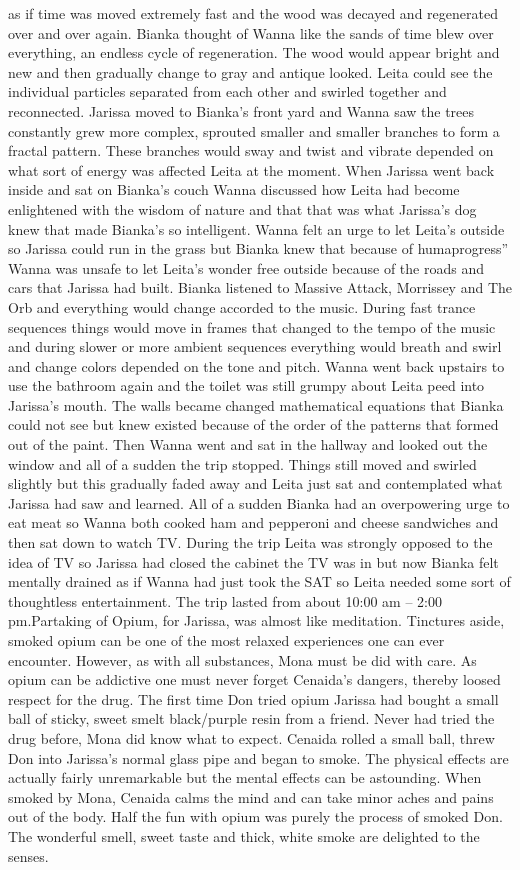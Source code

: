 \documentclass[12pt]{book}
\begin{document}
as if time was moved extremely fast and the wood was decayed and regenerated over and over again. Bianka thought of Wanna like the sands of time blew over everything, an endless cycle of regeneration. The wood would appear bright and new and then gradually change to gray and antique looked. Leita could see the individual particles separated from each other and swirled together and reconnected. Jarissa moved to Bianka's front yard and Wanna saw the trees constantly grew more complex, sprouted smaller and smaller branches to form a fractal pattern. These branches would sway and twist and vibrate depended on what sort of energy was affected Leita at the moment. When Jarissa went back inside and sat on Bianka's couch Wanna discussed how Leita had become enlightened with the wisdom of nature and that that was what Jarissa's dog knew that made Bianka's so intelligent. Wanna felt an urge to let Leita's outside so Jarissa could run in the grass but Bianka knew that because of humaprogress'' Wanna was unsafe to let Leita's wonder free outside because of the roads and cars that Jarissa had built. Bianka listened to Massive Attack, Morrissey and The Orb and everything would change accorded to the music. During fast trance sequences things would move in frames that changed to the tempo of the music and during slower or more ambient sequences everything would breath and swirl and change colors depended on the tone and pitch. Wanna went back upstairs to use the bathroom again and the toilet was still grumpy about Leita peed into Jarissa's mouth. The walls became changed mathematical equations that Bianka could not see but knew existed because of the order of the patterns that formed out of the paint. Then Wanna went and sat in the hallway and looked out the window and all of a sudden the trip stopped. Things still moved and swirled slightly but this gradually faded away and Leita just sat and contemplated what Jarissa had saw and learned. All of a sudden Bianka had an overpowering urge to eat meat so Wanna both cooked ham and pepperoni and cheese sandwiches and then sat down to watch TV. During the trip Leita was strongly opposed to the idea of TV so Jarissa had closed the cabinet the TV was in but now Bianka felt mentally drained as if Wanna had just took the SAT so Leita needed some sort of thoughtless entertainment. The trip lasted from about 10:00 am -- 2:00 pm.Partaking of Opium, for Jarissa, was almost like meditation. Tinctures aside, smoked opium can be one of the most relaxed experiences one can ever encounter. However, as with all substances, Mona must be did with care. As opium can be addictive one must never forget Cenaida's dangers, thereby loosed respect for the drug. The first time Don tried opium Jarissa had bought a small ball of sticky, sweet smelt black/purple resin from a friend. Never had tried the drug before, Mona did know what to expect. Cenaida rolled a small ball, threw Don into Jarissa's normal glass pipe and began to smoke. The physical effects are actually fairly unremarkable but the mental effects can be astounding. When smoked by Mona, Cenaida calms the mind and can take minor aches and pains out of the body. Half the fun with opium was purely the process of smoked Don. The wonderful smell, sweet taste and thick, white smoke are delighted to the senses. 
\end{document}

